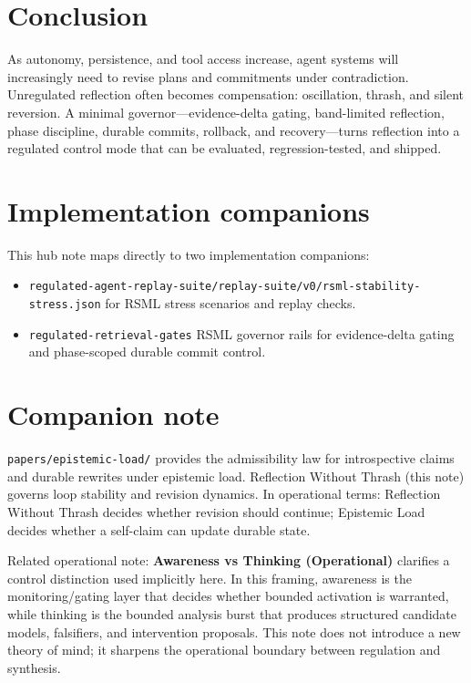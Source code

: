 \documentclass[11pt]{article}
\begin{document}
\section{Conclusion}
As autonomy, persistence, and tool access increase, agent systems will increasingly need to revise plans and
commitments under contradiction. Unregulated reflection often becomes compensation: oscillation, thrash,
and silent reversion. A minimal governor—evidence-delta gating, band-limited reflection, phase discipline,
durable commits, rollback, and recovery—turns reflection into a regulated control mode that can be
evaluated, regression-tested, and shipped.

\section{Implementation companions}
This hub note maps directly to two implementation companions:
\begin{itemize}
  \item \texttt{regulated-agent-replay-suite/replay-suite/v0/rsml-stability-stress.json} for RSML stress scenarios and replay checks.
  \item \texttt{regulated-retrieval-gates} RSML governor rails for evidence-delta gating and phase-scoped durable commit control.
\end{itemize}

\section{Companion note}
\texttt{papers/epistemic-load/} provides the admissibility law for introspective claims and durable
rewrites under epistemic load. Reflection Without Thrash (this note) governs loop stability and revision
dynamics. In operational terms: Reflection Without Thrash decides whether revision should continue;
Epistemic Load decides whether a self-claim can update durable state.

Related operational note: \textbf{Awareness vs Thinking (Operational)} clarifies a control distinction used
implicitly here. In this framing, awareness is the monitoring/gating layer that decides whether bounded
activation is warranted, while thinking is the bounded analysis burst that produces structured candidate
models, falsifiers, and intervention proposals. This note does not introduce a new theory of mind; it
sharpens the operational boundary between regulation and synthesis.
\end{document}
